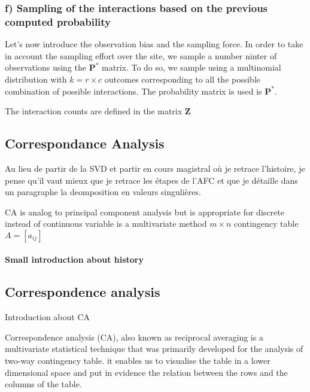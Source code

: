 \documentclass{article}
\begin{document}
\subsubsection{f) Sampling of the interactions based on the previous computed probability}
Let's now introduce the observation bias and the sampling force. In order to take in account the sampling effort over the site, we sample a number ninter of observations using the $\textbf{P}^*$ matrix. To do so, we sample using a multinomial distribution with $k = r \times c$ outcomes corresponding to all the possible combination of possible interactions. The probability matrix is used is $\textbf{P}^*$.

The interaction counts are defined in the matrix $\textbf{Z}$









\subsection{Correspondance Analysis}

Au lieu de partir de la SVD et partir en cours magistral où je retrace l'histoire, je pense qu'il vaut mieux que je retrace les étapes de l'AFC et que je détaille dans un paragraphe la deomposition en valeurs singulières.

CA is analog to principal component analysis but is appropriate for discrete instead of continuous variable
is a multivariate method
$m\times n$ contingency table $A = [a_{ij}]$ 

\paragraph{Small introduction about history}




\subsection{Correspondence analysis}

Introduction about CA

Correspondence analysis (CA), also known as reciprocal averaging is a multivariate statistical technique that was primarily developed for the analysis of two-way contingency table. it enables us to visualise the table in a lower dimensional space and put in evidence the relation between the rows and the columns of the table.
\end{document}
